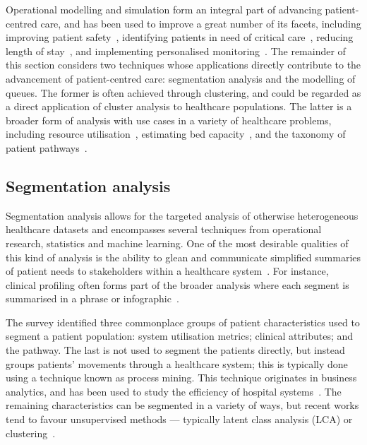 Operational modelling and simulation form an integral part of advancing
patient-centred care, and has been used to improve a great number of its facets,
including improving patient safety~\cite{Jun2010}, identifying patients in need
of critical care~\cite{Adeyemi2013}, reducing length of stay~\cite{Gul2012}, and
implementing personalised monitoring~\cite{Velikova2014}. The remainder of this
section considers two techniques whose applications directly contribute to the
advancement of patient-centred care: segmentation analysis and the modelling of
queues. The former is often achieved through clustering, and could be regarded
as a direct application of cluster analysis to healthcare populations. The
latter is a broader form of analysis with use cases in a variety of healthcare
problems, including resource utilisation~\cite{Prokofyeva2020}, estimating bed
capacity~\cite{Williams2015}, and the taxonomy of patient
pathways~\cite{Rojas2016}.


\subsection{Segmentation analysis}

Segmentation analysis allows for the targeted analysis of otherwise
heterogeneous healthcare datasets and encompasses several techniques from
operational research, statistics and machine learning. One of the most desirable
qualities of this kind of analysis is the ability to glean and communicate
simplified summaries of patient needs to stakeholders within a healthcare
system~\cite{ElDarzi2009,Tomar2013,Vuik2016b,Yoon2020}. For instance, clinical
profiling often forms part of the broader analysis where each segment is
summarised in a phrase or infographic~\cite{Vuik2016a,Yan2019}.

The survey identified three commonplace groups of patient characteristics used
to segment a patient population: system utilisation metrics; clinical
attributes; and the pathway. The last is not used to segment the patients
directly, but instead groups patients' movements through a healthcare system;
this is typically done using a technique known as process mining. This technique
originates in business analytics, and has been used to study the efficiency of
hospital systems~\cite{Arnolds2018,Delias2015}. The remaining characteristics
can be segmented in a variety of ways, but recent works tend to favour
unsupervised methods --- typically latent class analysis (LCA) or
clustering~\cite{Yan2018}.

